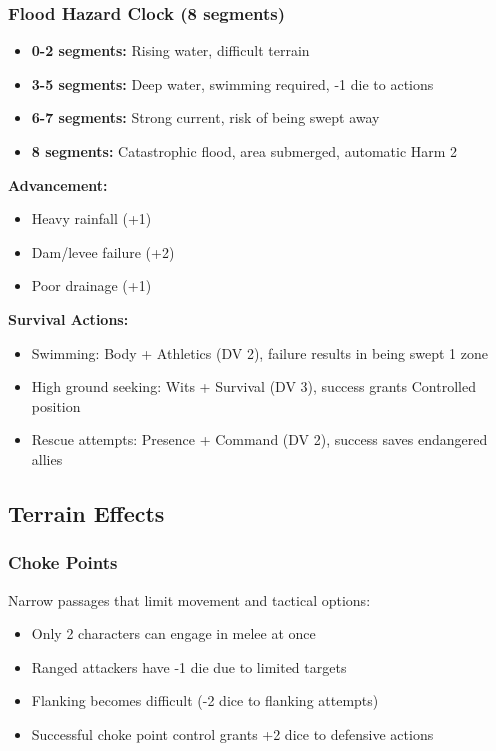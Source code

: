 \subsubsection{Flood Hazard Clock (8 segments)}
\begin{itemize}[leftmargin=*]
    \item \textbf{0-2 segments:} Rising water, difficult terrain
    \item \textbf{3-5 segments:} Deep water, swimming required, -1 die to actions
    \item \textbf{6-7 segments:} Strong current, risk of being swept away
    \item \textbf{8 segments:} Catastrophic flood, area submerged, automatic Harm 2
\end{itemize}

\textbf{Advancement:}
\begin{itemize}[leftmargin=*]
    \item Heavy rainfall (+1)
    \item Dam/levee failure (+2)
    \item Poor drainage (+1)
\end{itemize}

\textbf{Survival Actions:}
\begin{itemize}[leftmargin=*]
    \item Swimming: Body + Athletics (DV 2), failure results in being swept 1 zone
    \item High ground seeking: Wits + Survival (DV 3), success grants Controlled position
    \item Rescue attempts: Presence + Command (DV 2), success saves endangered allies
\end{itemize}

\subsection{Terrain Effects}

\subsubsection{Choke Points}
Narrow passages that limit movement and tactical options:
\begin{itemize}[leftmargin=*]
    \item Only 2 characters can engage in melee at once
    \item Ranged attackers have -1 die due to limited targets
    \item Flanking becomes difficult (-2 dice to flanking attempts)
    \item Successful choke point control grants +2 dice to defensive actions
\end{itemize}

